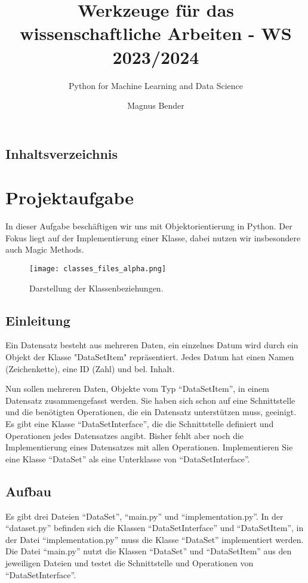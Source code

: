 \documentclass[
 oneside, %
 12pt, %
 a4paper, %
 parskip=full %
]{scrartcl}
\author{Magnus Bender}
\title{Werkzeuge für das wissenschaftliche Arbeiten - WS 2023/2024}
\subtitle{Python for Machine Learning and Data Science}
\begin{document}
 \maketitle

\tableofcontents

\subsection*{Inhaltsverzeichnis}

\section{Projektaufgabe}
In dieser Aufgabe beschäftigen wir uns mit Objektorientierung in Python. Der Fokus liegt auf der Implementierung einer Klasse, dabei nutzen wir insbesondere auch Magic Methods.
\begin{figure}[htbp]
  \centering
  \texttt{[image: classes\_files\_alpha.png]}
  \caption{Darstellung der Klassenbeziehungen.}
\end{figure}
\subsection{Einleitung}
Ein Datensatz besteht aus mehreren Daten, ein einzelnes Datum wird durch ein Objekt der Klasse "DataSetItem" repräsentiert. Jedes Datum hat einen Namen (Zeichenkette), eine ID (Zahl) und bel. Inhalt.

Nun sollen mehreren Daten, Objekte vom Typ ``DataSetItem'', in einem Datensatz zusammengefasst werden. Sie haben sich schon auf eine Schnittstelle und die benötigten Operationen, die ein Datensatz unterstützen muss, geeinigt. Es gibt eine Klasse ``DataSetInterface'', die die Schnittstelle definiert und Operationen jedes Datensatzes angibt. Bisher fehlt aber noch die Implementierung eines Datensatzes mit allen Operationen. Implementieren Sie eine Klasse ``DataSet'' als eine Unterklasse von ``DataSetInterface''.
\subsection{Aufbau}
Es gibt drei Dateien ``DataSet'', ``main.py'' und ``implementation.py''. In der ``dataset.py'' befinden sich die Klassen ``DataSetInterface'' und ``DataSetItem'', in der Datei ``implementation.py'' muss die Klasse ``DataSet'' implementiert werden. Die Datei ``main.py'' nutzt die Klassen ``DataSet'' und ``DataSetItem'' aus den jeweiligen Dateien und testet die Schnittstelle und Operationen von ``DataSetInterface''.
\end{document}
